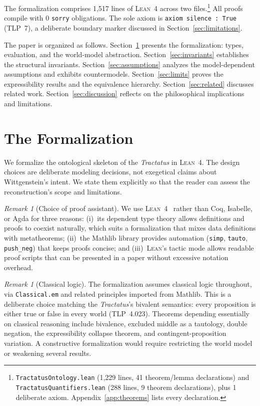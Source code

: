 \documentclass[10pt, letterpaper]{article}
\theoremstyle{definition}
\theoremstyle{remark}
\newtheorem{remark}[theorem]{Remark}
\newcommand{\Lean}{\textsc{Lean}}
\begin{document}
\noindent
The formalization comprises 1,517 lines of \Lean~4 across two
files.\footnote{%
  \texttt{TractatusOntology.lean} (1,229 lines, 41 theorem/lemma
  declarations) and \texttt{TractatusQuantifiers.lean} (288 lines,
  9 theorem declarations), plus 1 deliberate axiom.
  Appendix~\ref{app:theorems} lists every declaration.}
All proofs compile with 0 \texttt{sorry} obligations.
The sole axiom is \texttt{axiom silence : True} (TLP~7), a
deliberate boundary marker discussed in
Section~\ref{sec:limitations}.

The paper is organized as follows.
Section~\ref{sec:formalization} presents the formalization:
types, evaluation, and the world-model abstraction.
Section~\ref{sec:invariants} establishes the structural
invariants.
Section~\ref{sec:assumptions} analyzes the model-dependent
assumptions and exhibits countermodels.
Section~\ref{sec:limits} proves the expressibility results and
the equivalence hierarchy.
Section~\ref{sec:related} discusses related work.
Section~\ref{sec:discussion} reflects on the philosophical
implications and limitations.

\section{The Formalization}
\label{sec:formalization}

We formalize the ontological skeleton of the \emph{Tractatus}
in \Lean~4.  The design choices are deliberate modeling
decisions, not exegetical claims about Wittgenstein's intent.
We state them explicitly so that the reader can assess the
reconstruction's scope and limitations.

\begin{remark}[Choice of proof assistant]
\label{rem:lean4}
We use \Lean~4~\cite{moura2021} rather than Coq, Isabelle, or
Agda for three reasons: (i)~its dependent type theory allows
definitions and proofs to coexist naturally, which suits a
formalization that mixes data definitions with metatheorems;
(ii)~the Mathlib library provides automation
(\texttt{simp}, \texttt{tauto}, \texttt{push\_neg}) that keeps
proofs concise; and (iii)~\Lean's tactic mode allows readable
proof scripts that can be presented in a paper without excessive
notation overhead.
\end{remark}

\begin{remark}[Classical logic]
\label{rem:classical}
The formalization assumes classical logic throughout, via
\texttt{Classical.em} and related principles imported from
Mathlib.  This is a deliberate choice matching the
\emph{Tractatus}'s bivalent semantics: every proposition is
either true or false in every world (TLP~4.023).
Theorems depending essentially on classical reasoning include
bivalence, excluded middle as a tautology, double negation,
the expressibility collapse theorem, and contingent-proposition
variation.  A constructive formalization would require
restricting the world model or weakening several results.
\end{remark}
\end{document}
